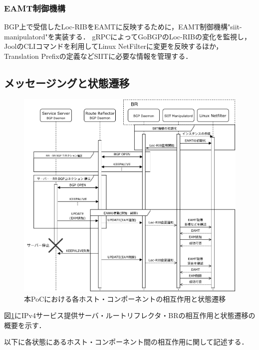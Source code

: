 \subsubsection{EAMT制御機構}
\label{implementation:poc:siit-manipulatord}
BGP上で受信したLoc-RIBをEAMTに反映するために，EAMT制御機構"siit-manipulatord"を実装する．
gRPCによってGoBGPのLoc-RIBの変化を監視し，JoolのCLIコマンドを利用してLinux NetFilterに変更を反映するほか，Translation Prefixの定義などSIITに必要な情報を管理する．

\subsection{メッセージングと状態遷移}
\label{implementation:poc:sequence}

\begin{figure}[H]
    \begin{center}
    \includegraphics[width=15cm,pagebox=cropbox,clip]{img/sequence_manipulatord.pdf}
    \end{center}
    \caption{本PoCにおける各ホスト・コンポーネントの相互作用と状態遷移}
    \label{fig:poc_implementation}
\end{figure}

図\ref{fig:poc_implementation}にIPv4サービス提供サーバ・ルートリフレクタ・BRの相互作用と状態遷移の概要を示す．

以下に各状態にあるホスト・コンポーネント間の相互作用に関して記述する．

